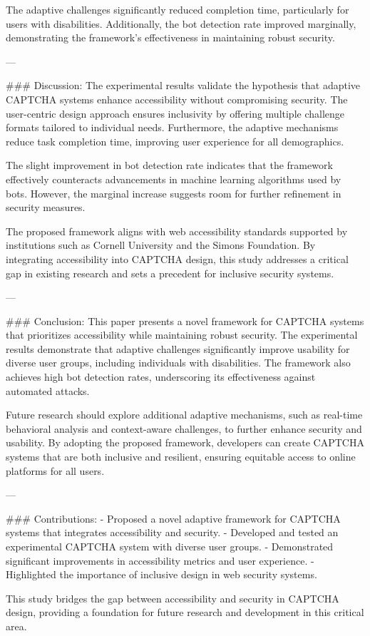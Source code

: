 The adaptive challenges significantly reduced completion time, particularly for users with disabilities. Additionally, the bot detection rate improved marginally, demonstrating the framework’s effectiveness in maintaining robust security.

---

### Discussion:
The experimental results validate the hypothesis that adaptive CAPTCHA systems enhance accessibility without compromising security. The user-centric design approach ensures inclusivity by offering multiple challenge formats tailored to individual needs. Furthermore, the adaptive mechanisms reduce task completion time, improving user experience for all demographics.

The slight improvement in bot detection rate indicates that the framework effectively counteracts advancements in machine learning algorithms used by bots. However, the marginal increase suggests room for further refinement in security measures.

The proposed framework aligns with web accessibility standards supported by institutions such as Cornell University and the Simons Foundation. By integrating accessibility into CAPTCHA design, this study addresses a critical gap in existing research and sets a precedent for inclusive security systems.

---

### Conclusion:
This paper presents a novel framework for CAPTCHA systems that prioritizes accessibility while maintaining robust security. The experimental results demonstrate that adaptive challenges significantly improve usability for diverse user groups, including individuals with disabilities. The framework also achieves high bot detection rates, underscoring its effectiveness against automated attacks.

Future research should explore additional adaptive mechanisms, such as real-time behavioral analysis and context-aware challenges, to further enhance security and usability. By adopting the proposed framework, developers can create CAPTCHA systems that are both inclusive and resilient, ensuring equitable access to online platforms for all users.

---

### Contributions:
- Proposed a novel adaptive framework for CAPTCHA systems that integrates accessibility and security.
- Developed and tested an experimental CAPTCHA system with diverse user groups.
- Demonstrated significant improvements in accessibility metrics and user experience.
- Highlighted the importance of inclusive design in web security systems.

This study bridges the gap between accessibility and security in CAPTCHA design, providing a foundation for future research and development in this critical area.